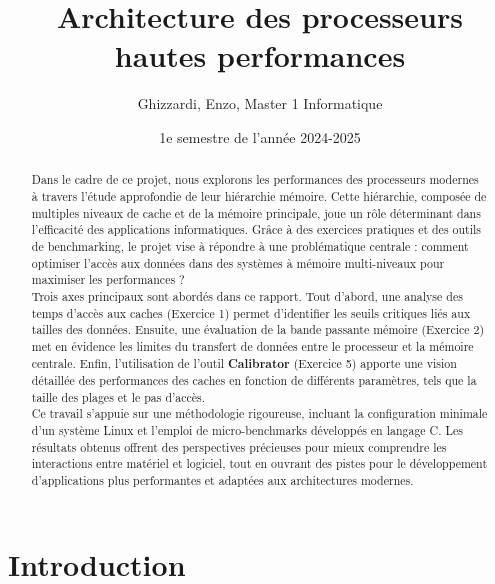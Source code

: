 \documentclass{rapport}
\title{Architecture des processeurs hautes performances}
\author{Ghizzardi, Enzo, Master 1 Informatique}
\date{1e semestre de l'année 2024-2025}
\begin{document}
  \maketitle

  \begin{abstract}
    Dans le cadre de ce projet, nous explorons les performances des processeurs modernes à travers l’étude approfondie de leur hiérarchie mémoire. Cette hiérarchie, composée de multiples niveaux de cache et de la mémoire principale, joue un rôle déterminant dans l’efficacité des applications informatiques. Grâce à des exercices pratiques et des outils de benchmarking, le projet vise à répondre à une problématique centrale : comment optimiser l’accès aux données dans des systèmes à mémoire multi-niveaux pour maximiser les performances ?\\[1mm]
    
    Trois axes principaux sont abordés dans ce rapport. Tout d’abord, une analyse des temps d’accès aux caches (Exercice 1) permet d’identifier les seuils critiques liés aux tailles des données. Ensuite, une évaluation de la bande passante mémoire (Exercice 2) met en évidence les limites du transfert de données entre le processeur et la mémoire centrale. Enfin, l’utilisation de l’outil \textbf{Calibrator} (Exercice 5) apporte une vision détaillée des performances des caches en fonction de différents paramètres, tels que la taille des plages et le pas d’accès.\\[1mm]
    
    Ce travail s’appuie sur une méthodologie rigoureuse, incluant la configuration minimale d’un système Linux et l’emploi de micro-benchmarks développés en langage C. Les résultats obtenus offrent des perspectives précieuses pour mieux comprendre les interactions entre matériel et logiciel, tout en ouvrant des pistes pour le développement d’applications plus performantes et adaptées aux architectures modernes.\\[1mm]
  \end{abstract}

  \clearpage
  \tableofcontents

  \clearpage


    \section{Introduction}
    
\end{document}
